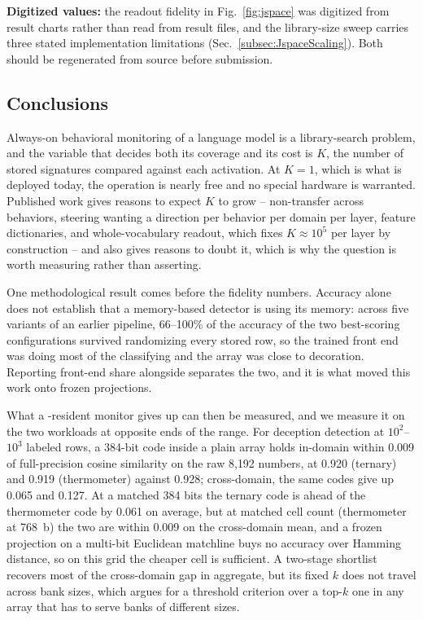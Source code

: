 \textbf{Digitized values:} the readout fidelity in
Fig.~\ref{fig:jspace} was digitized from result charts rather than read
from result files, and the library-size sweep carries three stated
implementation limitations (Sec.~\ref{subsec:JspaceScaling}). Both
should be regenerated from source before submission.

\subsection{Conclusions}
\label{subsec:Conclusions}
Always-on behavioral monitoring of a language model is a library-search
problem, and the variable that decides both its coverage and its cost is
$K$, the number of stored signatures compared against each activation. At
$K=1$, which is what is deployed today, the operation is nearly free and
no special hardware is warranted. Published work gives reasons to expect
$K$ to grow -- non-transfer across behaviors, steering wanting a
direction per behavior per domain per layer, feature dictionaries, and
whole-vocabulary readout, which fixes $K\!\approx\!10^{5}$ per layer by
construction -- and also gives reasons to doubt it, which is why the
question is worth measuring rather than asserting.

One methodological result comes before the fidelity numbers. Accuracy
alone does not establish that a memory-based detector is using its
memory: across five variants of an earlier pipeline, 66--100\% of the
accuracy of the two best-scoring configurations survived randomizing
every stored row, so the trained front end was doing most of the
classifying and the array was close to decoration. Reporting front-end
share alongside \auroc separates the two, and it is what moved this work
onto frozen projections.

What a \cam-resident monitor gives up can then be measured, and we
measure it on the two workloads at opposite ends of the range. For
deception detection at $10^{2}$--$10^{3}$ labeled rows, a 384-bit code
inside a plain array holds in-domain \auroc within 0.009 of
full-precision cosine similarity on the raw 8{,}192 numbers, at 0.920
(\signrp ternary) and 0.919 (thermometer) against 0.928; cross-domain,
the same codes give up 0.065 and 0.127. At a matched 384 bits the
ternary code is ahead of the thermometer code by 0.061 on average, but
at matched cell count (thermometer at 768~b) the two are within 0.009
on the cross-domain mean, and a frozen projection on a multi-bit
Euclidean matchline buys no accuracy over Hamming distance, so on this
grid the cheaper cell is sufficient. A two-stage shortlist recovers most of the
cross-domain gap in aggregate, but its fixed $k$ does not travel across
bank sizes, which argues for a threshold criterion over a top-$k$ one in
any array that has to serve banks of different sizes.

